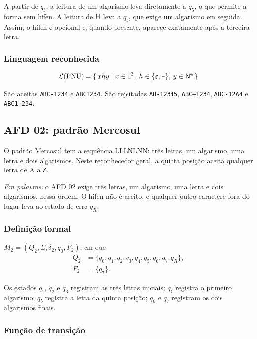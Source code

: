 A partir de $q_3$, a leitura de um algarismo leva diretamente a
$q_5$, o que permite a forma sem hífen. A leitura de $\mathsf{H}$ leva a
$q_4$, que exige um algarismo em seguida. Assim, o hífen é opcional
e, quando presente, aparece exatamente após a terceira letra.

\subsubsection{Linguagem reconhecida}

\[
  \mathcal{L}(\mathrm{PNU}) = \{\, xhy \mid x \in \mathsf{L}^3,\; h \in \{\varepsilon, \texttt{-}\},\; y \in \mathsf{N}^4 \,\}
\]

São aceitas \texttt{ABC-1234} e \texttt{ABC1234}. São rejeitadas
\texttt{AB-12345}, \texttt{ABC--1234}, \texttt{ABC-12A4} e
\texttt{ABC1-234}.

\subsection{AFD 02: padrão Mercosul}

O padrão Mercosul tem a sequência LLLNLNN: três letras, um
algarismo, uma letra e dois algarismos. Neste reconhecedor geral, a
quinta posição aceita qualquer letra de A a Z.

\emph{Em palavras:} o AFD 02 exige três letras, um algarismo, uma
letra e dois algarismos, nessa ordem. O hífen não é aceito, e
qualquer outro caractere fora do lugar leva ao estado de erro $q_R$.

\subsubsection{Definição formal}

$M_2 = (Q_2, \Sigma, \delta_2, q_0, F_2)$, em que
\begin{align*}
  Q_2 &= \{q_0, q_1, q_2, q_3, q_4, q_5, q_6, q_7, q_R\},\\
  F_2 &= \{q_7\}.
\end{align*}

Os estados $q_1$, $q_2$ e $q_3$ registram as três letras iniciais;
$q_4$ registra o primeiro algarismo; $q_5$ registra a letra da quinta
posição; $q_6$ e $q_7$ registram os dois algarismos finais.

\subsubsection{Função de transição}


